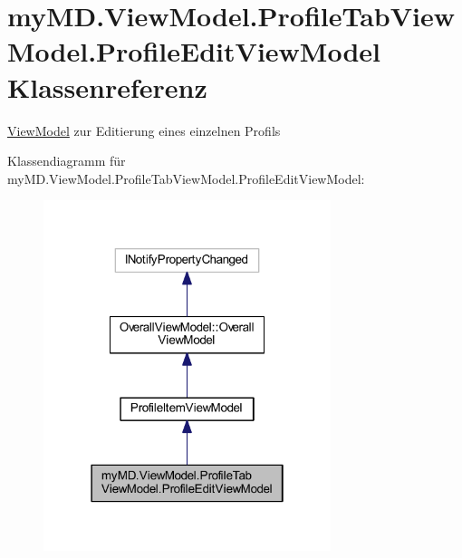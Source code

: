 \hypertarget{classmy_m_d_1_1_view_model_1_1_profile_tab_view_model_1_1_profile_edit_view_model}{}\section{my\+M\+D.\+View\+Model.\+Profile\+Tab\+View\+Model.\+Profile\+Edit\+View\+Model Klassenreferenz}
\label{classmy_m_d_1_1_view_model_1_1_profile_tab_view_model_1_1_profile_edit_view_model}


\mbox{\hyperlink{namespacemy_m_d_1_1_view_model}{View\+Model}} zur Editierung eines einzelnen Profils  




Klassendiagramm für my\+M\+D.\+View\+Model.\+Profile\+Tab\+View\+Model.\+Profile\+Edit\+View\+Model\+:\nopagebreak
\begin{figure}[H]
\begin{center}
\leavevmode
\includegraphics[width=238pt]{classmy_m_d_1_1_view_model_1_1_profile_tab_view_model_1_1_profile_edit_view_model__inherit__graph}
\end{center}
\end{figure}



